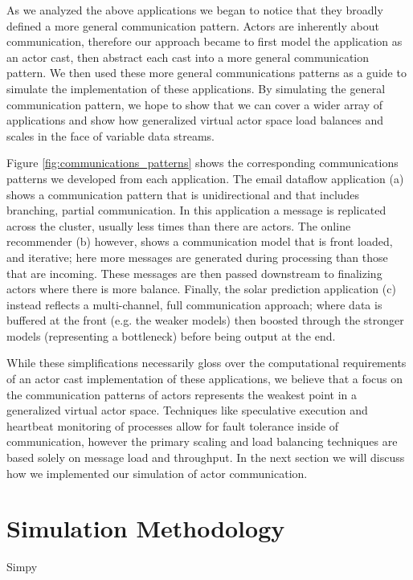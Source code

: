 \documentclass[conference,twocolumn,11pt]{IEEEtran}
\begin{document}
As we analyzed the above applications we began to notice that they broadly defined a more general communication pattern. Actors are inherently about communication, therefore our approach became to first model the application as an actor cast, then abstract each cast into a more general communication pattern. We then used these more general communications patterns as a guide to simulate the implementation of these applications. By simulating the general communication pattern, we hope to show that we can cover a wider array of applications and show how generalized virtual actor space load balances and scales in the face of variable data streams.

Figure \ref{fig:communications_patterns} shows the corresponding communications patterns we developed from each application. The email dataflow application (a) shows a communication pattern that is unidirectional and that includes branching, partial communication. In this application a message is replicated across the cluster, usually less times than there are actors. The online recommender (b) however, shows a communication model that is front loaded, and iterative; here more messages are generated during processing than those that are incoming. These messages are then passed downstream to finalizing actors where there is more balance. Finally, the solar prediction application (c) instead reflects a multi-channel, full communication approach; where data is buffered at the front (e.g. the weaker models) then boosted through the stronger models (representing a bottleneck) before being output at the end.

While these simplifications necessarily gloss over the computational requirements of an actor cast implementation of these applications, we believe that a focus on the communication patterns of actors represents the weakest point in a generalized virtual actor space. Techniques like speculative execution and heartbeat monitoring of processes allow for fault tolerance inside of communication, however the primary scaling and load balancing techniques are based solely on message load and throughput. In the next section we will discuss how we implemented our simulation of actor communication. 

\section{Simulation Methodology}

Simpy \cite{matloff_introduction_2008}
\end{document}
